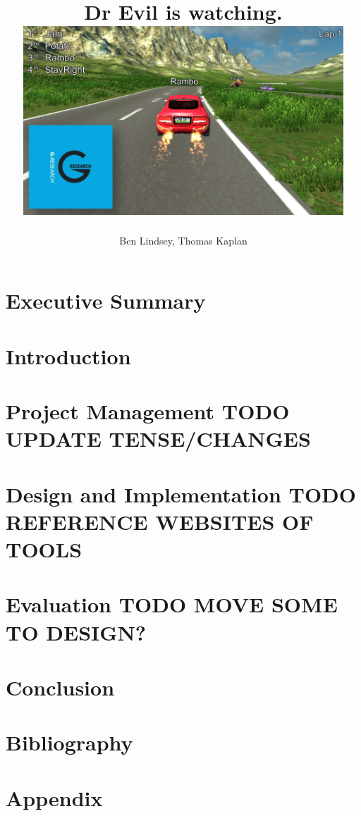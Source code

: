 \documentclass[11pt]{report}
\title{	
  {\huge \project}\\
  {\large Dr Evil is watching.}\\[2em]
  {\centering \includegraphics[width=0.9\textwidth]{coverpic.png}}
}
\author{Ben Lindsey, Thomas Kaplan}
\begin{document}
\maketitle

\chapter*{Executive Summary}


\tableofcontents

\chapter{Introduction}


\chapter{Project Management TODO UPDATE TENSE/CHANGES}


\chapter{Design and Implementation TODO REFERENCE WEBSITES OF TOOLS }


\chapter{Evaluation TODO MOVE SOME TO DESIGN?}


\chapter{Conclusion}


\chapter{Bibliography}
\printbibliography[heading=none]

\appendix
\chapter{Appendix}

\end{document}
